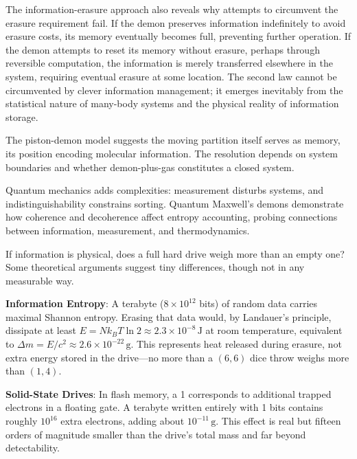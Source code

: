 The information-erasure approach also reveals why attempts to circumvent the erasure requirement fail. If the demon preserves information indefinitely to avoid erasure costs, its memory eventually becomes full, preventing further operation. If the demon attempts to reset its memory without erasure, perhaps through reversible computation, the information is merely transferred elsewhere in the system, requiring eventual erasure at some location. The second law cannot be circumvented by clever information management; it emerges inevitably from the statistical nature of many-body systems and the physical reality of information storage.

The \QSOpen{}piston-demon\QSClose{} model suggests the moving partition itself serves as memory, its position encoding molecular information. The resolution depends on system boundaries and whether demon-plus-gas constitutes a closed system.

Quantum mechanics adds complexities: measurement disturbs systems, and indistinguishability constrains sorting. Quantum Maxwell's demons demonstrate how coherence and decoherence affect entropy accounting, probing connections between information, measurement, and thermodynamics.

\begin{commentary}
    If information is physical, does a full hard drive weigh more than an empty one? Some theoretical arguments suggest tiny differences, though not in any measurable way.
    
    \textbf{Information Entropy}: A terabyte ($8\times10^{12}$ bits) of random data carries maximal Shannon entropy. Erasing that data would, by Landauer's principle, dissipate at least 
    $E = N k_B T \ln 2 \approx 2.3\times10^{-8}\,\text{J}$ at room temperature, equivalent to $\Delta m = E/c^2 \approx 2.6\times10^{-22}\,\text{g}$. This represents heat released during erasure, not extra energy stored in the drive—no more than a $(6,6)$ dice throw weighs more than $(1,4)$.
    
    \textbf{Solid-State Drives}: In flash memory, a \QSOpen{}1\QSClose{} corresponds to additional trapped electrons in a floating gate. A terabyte written entirely with \QSOpen{}1\QSClose{} bits contains roughly $10^{16}$ extra electrons, adding about $10^{-11}\,\text{g}$. This effect is real but fifteen orders of magnitude smaller than the drive's total mass and far beyond detectability.
\end{commentary}
    
    

